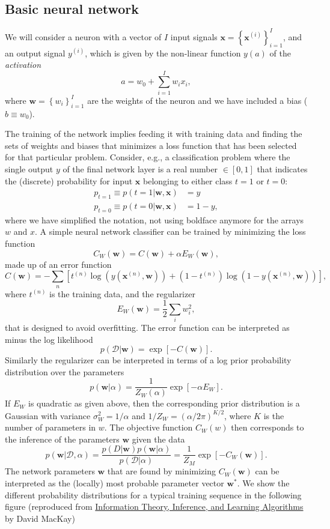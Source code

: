 \documentclass[%
oneside,                 %
final,                   %
10pt]{article}
\begin{document}
\noindent
\subsection{Basic neural network}
We will consider a neuron with a vector of $I$ input signals $\boldsymbol{x} = \left\{ \boldsymbol{x}^{(i)} \right\}_{i=1}^I$, and an output signal $y^{(i)}$, which is given by the non-linear function $y(a)$ of the \emph{activation}
\[ a = w_0 +  \sum_{i=1}^I w_i x_i, \]
where $\boldsymbol{w} = \left\{ w_i \right\}_{i=1}^I$ are the weights of the neuron and we have included a bias ($b \equiv w_0$).

The training of the network implies feeding it with training data and finding the sets of weights and biases that minimizes a loss function that has been selected for that particular problem.
Consider, e.g., a classification problem where the single output $y$ of the final network layer is a real number $\in [0,1]$ that indicates the (discrete) probability for input $\boldsymbol{x}$ belonging to either class $t=1$ or $t=0$:
\begin{align}
p_{t=1} \equiv p(t=1 | \boldsymbol{w},\boldsymbol{x}) &= y \\
p_{t=0} \equiv p(t=0 | \boldsymbol{w},\boldsymbol{x}) &= 1-y,
\end{align}
where we have simplified the notation, not using boldface anymore for the arrays $w$ and $x$.
A simple neural network classifier can be trained by minimizing the loss function
\[ C_W(\boldsymbol{w}) = C(\boldsymbol{w}) +  \alpha E_W(\boldsymbol{w}), \]
made up of an error function
\[ C(\boldsymbol{w}) = -\sum_n \left[ t^{(n)} \log ( y(\boldsymbol{x}^{(n)},\boldsymbol{w})) + (1 - t^{(n)}) \log (1 - y(\boldsymbol{x}^{(n)},\boldsymbol{w})) \right], \]
where $t^{(n)}$ is the training data, and the regularizer
\[ E_W(\boldsymbol{w}) = \frac{1}{2} \sum_i w_i^2, \]
that is designed to avoid overfitting.
The error function can be interpreted as minus the log likelihood
\[ p(\mathcal{D}|\boldsymbol{w}) = \exp\left[ - C(\boldsymbol{w}) \right]. \]
Similarly the regularizer can be interpreted in terms of a log prior probability distribution over the parameters
\[ p(\boldsymbol{w} | \alpha) = \frac{1}{Z_W(\alpha)} \exp \left[ -\alpha E_W \right]. \]
If $E_W$ is quadratic as given above, then the corresponding prior distribution is a Gaussian with variance $\sigma_W^2 = 1/\alpha$ and $1/Z_W = (\alpha/2\pi)^{K/2}$, where $K$ is the number of parameters in $w$.
The objective function $C_W(w)$ then corresponds to the inference of the parameters $\boldsymbol{w}$ given the data
\[ p(\boldsymbol{w} | \mathcal{D}, \alpha) = \frac{p(D|\boldsymbol{w}) p(\boldsymbol{w}|\alpha)}{p(\mathcal{D}|\alpha)} = \frac{1}{Z_M} \exp [ -C_W(\boldsymbol{w}) ]. \]
The network parameters $\boldsymbol{w}$ that are found by minimizing $C_W(\boldsymbol{w})$ can be interpreted as the (locally) most probable parameter vector $\boldsymbol{w}^*$. We show the different probability distributions for a typical training sequence in the following figure (reproduced from \href{{http://www.inference.org.uk/mackay/itila/}}{Information Theory, Inference, and Learning Algorithms} by David MacKay)
\end{document}
